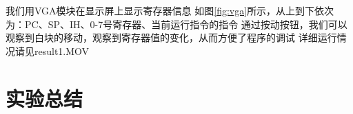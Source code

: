 \documentclass{article}
\begin{document}
我们用VGA模块在显示屏上显示寄存器信息
如图\ref{fig:vga}所示，从上到下依次为：PC、SP、IH、0-7号寄存器、当前运行指令的指令
通过按动按钮，我们可以观察到白块的移动，观察到寄存器值的变化，从而方便了程序的调试
详细运行情况请见result1.MOV

\section{实验总结}



%

%

\end{document}
